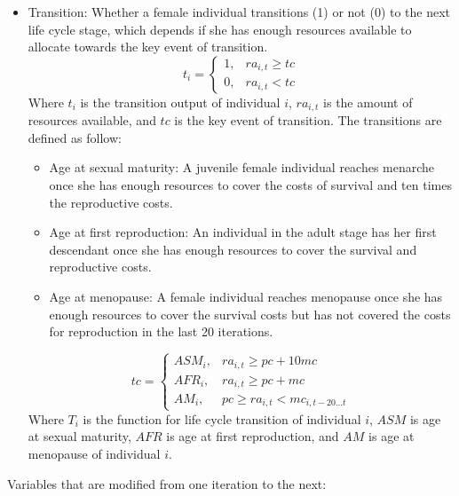\documentclass{article}
\begin{document}
\begin{itemize}
        \item Transition: Whether a female individual transitions (1) or not (0) to the next life cycle stage, which depends if she has enough resources available to allocate towards the key event of transition.
\begin{equation}
    t_i=\begin{cases}
    1,& ra_{i,t} \geq tc\\
    0,& ra_{i,t} < tc
\end{cases}
\end{equation}
        Where $t_i$ is the transition output of individual $i$, $ra_{i,t}$ is the amount of resources available, and $tc$ is the key event of transition. The transitions are defined as follow:
        \begin{itemize}
            \item Age at sexual maturity: A juvenile female individual reaches menarche once she has enough resources to cover the costs of survival and ten times the reproductive costs.
            \item Age at first reproduction: An individual in the adult stage has her first descendant once she has enough resources to cover the survival and reproductive costs.
            \item Age at menopause: A female individual reaches menopause once she has enough resources to cover the survival costs but has not covered the costs for reproduction in the last 20 iterations. 
        \end{itemize}
\begin{equation}
    tc=\begin{cases}
    ASM_i,& ra_{i,t} \geq pc+10mc\\
    AFR_i,& ra_{i,t} \geq pc+mc\\
    AM_i,& pc \geq ra_{i,t} < mc_{i,t-20...t}
\end{cases}
\end{equation}
        Where $T_i$ is the function for life cycle transition of individual $i$, $ASM$ is age at sexual maturity, $AFR$ is age at first reproduction, and $AM$ is age at menopause of individual $i$.
    \end{itemize}
Variables that are modified from one iteration to the next:
\end{document}
